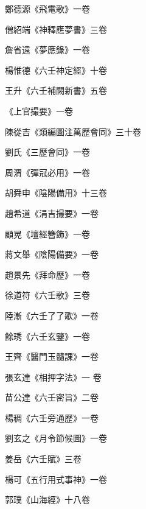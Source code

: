 \begin{pinyinscope}
 鄭德源《飛電歌》一卷



 僧紹端《神釋應夢書》三卷



 詹省遠《夢應錄》一卷



 楊惟德《六壬神定經》十卷



 王升《六壬補闕新書》五卷



 《上官撮要》一卷



 陳從吉《類編圖注萬歷會同》三十卷



 劉氏《三歷會同》一卷



 周渭《彈冠必用》一卷



 胡舜申《陰陽備用》十三卷



 趙希道《涓吉撮要》一卷



 顧晃《壇經簪飾》一卷



 蔣文舉《陰陽備要》一卷



 趙景先《拜命歷》一卷



 徐道符《六壬歌》三卷



 陸漸《六壬了了歌》一卷



 餘琇《六壬玄鑒》一卷



 王齊《醫門玉髓課》一卷



 張玄達《相押字法》一
 卷



 苗公達《六壬密旨》二卷



 楊稠《六壬旁通歷》一卷



 劉玄之《月令節候圖》一卷



 姜岳《六壬賦》三卷



 楊可《五行用式事神》一卷



 郭璞《山海經》十八卷




\end{pinyinscope}
